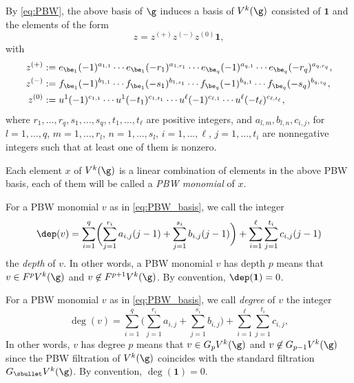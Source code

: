 By \eqref{eq:PBW},
the above basis of $\g$
induces a basis of $V^k(\g)$ consisted of $\mathbf{1}$
and the elements of the form
\begin{equation}
\label{eq:PBW_basis}
z = z^{(+)} z^{(-)} z^{(0)} \mathbf{1},
\end{equation}
with
\begin{align*}
z^{(+)} &:= e_{\be_{1}}(-1)^{a_{1,1}}\cdots
e_{\be_{1}} (- r_1)^{a_{1,r_1}}\cdots
e_{\be_q}(- 1)^{a_{q,1}}\cdots e_{\be_q}(- r_q)^{a_{q,r_q}}, \\
z^{(-)} &:=f_{\be_1}(-1)^{b_{1,1}}\cdots f_{\be_1}(- s_1)^{b_{1,s_1}}\cdots
f_{\be_q}(- 1)^{b_{q,1}}
\cdots f_{\be_q}(- s_q)^{b_{q,s_q}}, \\
z^{(0)} &:= u^1(- 1)^{c_{1,1}}\cdots u^1(- t_1)^{c_{1,t_1}}
\cdots u^\ell (- 1)^{c_{\ell,1}}\cdots u^\ell(- t_\ell)^{c_{\ell, t_\ell}},
\end{align*}
where $r_1,\dots,r_q, s_1,\dots,s_q,,t_1,\dots,t_\ell$
are positive integers, and $a_{l,m},b_{l,n},c_{i,j}$, for $l =1,\dots,q$,
$m=1,\dots,r_l$, $n=1,\dots,s_l$, $i = 1,\dots,\ell$, $j=1,\dots,t_i$
are nonnegative integers such
that at least one of them is nonzero.

\begin{defn}
\label{def:monomial_V}
Each element $x$ of $V^k(\g)$
is a linear combination of elements in the above PBW basis,
each of them will be called a \emph{PBW monomial} of $x$.
\end{defn}

\begin{defn}
\label{def:depth_V}
For a PBW monomial $v$ as in \eqref{eq:PBW_basis},
we call the integer
\begin{equation*}
\dep(v) =\sum_{i=1}^q \biggl(\sum_{j=1}^{r_i}
a_{i,j}(j-1) + \sum_{j=1}^{s_i} b_{i,j} (j-1) \biggr)
+ \sum_{i=1}^\ell \sum_{j=1}^{t_i} c_{i,j}(j-1)
\end{equation*}
the \emph{depth} of $v$.
In other words, a PBW monomial $v$ has depth $p$ means that
$v \in F^{p}V^k(\g)$ and $v \not \in F^{p+1}V^k(\g)$.
By convention, $\dep(\mathbf{1})=0$.

For a PBW monomial $v$ as in \eqref{eq:PBW_basis},
we call \emph{degree} of $v$ the integer
\begin{equation*}
\deg(v) =
\sum_{i=1}^q \biggl(\sum_{j=1}^{r_i}
a_{i,j} + \sum_{j=1}^{s_i} b_{i,j}\biggr)
+ \sum_{i=1}^\ell \sum_{j=1}^{t_i} c_{i,j},
\end{equation*}
In other words, $v$ has degree $p$ means that
$v \in G_{p}V^k(\g)$ and $v \not \in G_{p-1}V^k(\g)$
since the PBW filtration of $V^k(\g)$ coincides with the
standard filtration $G_\sbullet V^k(\g)$.
By convention, $\deg(\mathbf{1})=0$.
\end{defn}

